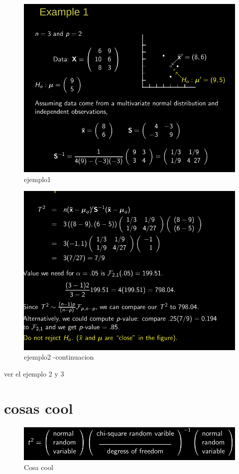 \documentclass[10pt,a4paper]{article} %
\begin{document}
        \begin{figure}[h!]
            \centering
            \includegraphics[width=0.8\linewidth]{ejemplo1.png}
            \caption{ejemplo1}
            \label{ejem}
        \end{figure}

        \begin{figure}[h!]
            \centering
            \includegraphics[width=0.8\linewidth]{ejem1.png}
            \caption{ejemplo2 -continuacion}
            \label{ejem}
        \end{figure}

        \color{red} ver el ejemplo 2 y 3\color{white}

    \section{cosas cool}

        \begin{figure}[h!]
            \centering
            \includegraphics[width=0.8\linewidth]{cool.png}
            \caption{Cosa cool}
            \label{fig}
        \end{figure}
\end{document}

